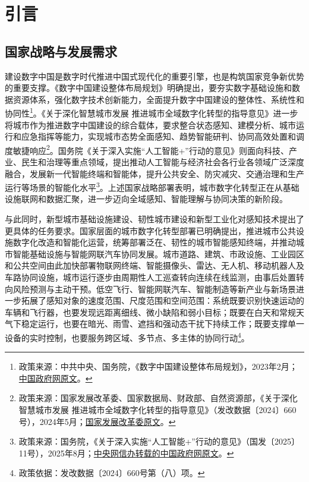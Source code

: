 \section{引言}

\subsection{国家战略与发展需求}

建设数字中国是数字时代推进中国式现代化的重要引擎，也是构筑国家竞争新优势的重要支撑。《数字中国建设整体布局规划》明确提出，要夯实数字基础设施和数据资源体系，强化数字技术创新能力，全面提升数字中国建设的整体性、系统性和协同性\footnote{政策来源：中共中央、国务院，《数字中国建设整体布局规划》，2023年2月；\href{https://www.gov.cn/zhengce/2023-02/27/content_5743484.htm}{中国政府网原文}。}。《关于深化智慧城市发展 推进城市全域数字化转型的指导意见》进一步将城市作为推进数字中国建设的综合载体，要求整合状态感知、建模分析、城市运行和应急指挥等能力，实现城市态势全面感知、趋势智能研判、协同高效处置和调度敏捷响应\footnote{政策来源：国家发展改革委、国家数据局、财政部、自然资源部，《关于深化智慧城市发展 推进城市全域数字化转型的指导意见》（发改数据〔2024〕660号），2024年5月；\href{https://www.ndrc.gov.cn/xxgk/zcfb/tz/202405/t20240520_1386326_ext.html}{国家发展改革委原文}。}。国务院《关于深入实施“人工智能+”行动的意见》则面向科技、产业、民生和治理等重点领域，提出推动人工智能与经济社会各行业各领域广泛深度融合，发展新一代智能终端和智能体，提升公共安全、防灾减灾、交通治理和生产运行等场景的智能化水平\footnote{政策来源：国务院，《关于深入实施“人工智能+”行动的意见》（国发〔2025〕11号），2025年8月；\href{https://www.cac.gov.cn/2025-08/27/c_1758018277755538.htm}{中央网信办转载的中国政府网原文}。}。上述国家战略部署表明，城市数字化转型正在从基础设施联网和数据汇聚，进一步迈向全域感知、智能理解与协同决策的新阶段。

与此同时，新型城市基础设施建设、韧性城市建设和新型工业化对感知技术提出了更具体的任务要求。国家层面的城市数字化转型部署已明确提出，推进城市公共设施数字化改造和智能化运营，统筹部署泛在、韧性的城市智能感知终端，并推动城市智能基础设施与智能网联汽车协同发展。城市道路、建筑、市政设施、工业园区和公共空间由此加快部署物联网终端、智能摄像头、雷达、无人机、移动机器人及车路协同设施，城市运行逐步由周期性人工巡查转向连续在线监测，由事后处置转向风险预测与主动干预。低空飞行、智能网联汽车、智能制造等新产业与新场景进一步拓展了感知对象的速度范围、尺度范围和空间范围：系统既要识别快速运动的车辆和飞行器，也要发现远距离细线、微小缺陷和弱小目标；既要在白天和常规天气下稳定运行，也要在暗光、雨雪、遮挡和强动态干扰下持续工作；既要支撑单一设备的实时控制，也要服务跨区域、多节点、多主体的协同行动\footnote{政策依据：发改数据〔2024〕660号第（八）项。}。

